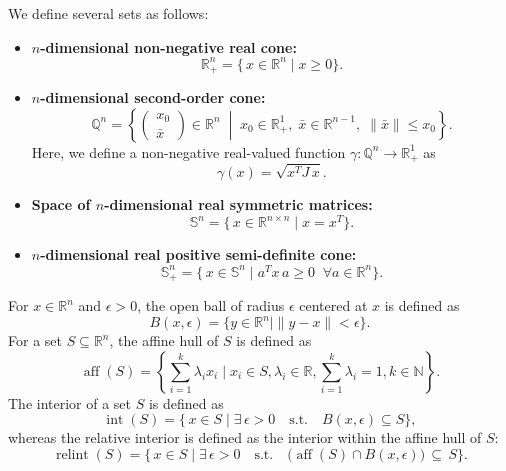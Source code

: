 We define several sets as follows:
\begin{itemize}
    \item 
    \textbf{$n$-dimensional non-negative real cone:} \\
    \[
      \mathbb{R}^n_+ 
      = \{\,x \in \mathbb{R}^n \mid x \geq 0 \}.
    \]

    \item 
    \textbf{$n$-dimensional second-order cone:} \\
    \[
      \mathbb{Q}^n 
      = \left\{ \begin{pmatrix} x_0 \\ \bar{x} \end{pmatrix} \in \mathbb{R}^n 
         \;\middle|\; x_0 \in \mathbb{R}^1_+, \; \bar{x} \in \mathbb{R}^{n-1}, \; \|\bar{x}\| \le x_0 \right\}.
    \]
    Here, we define a non-negative real-valued function $\gamma : \mathbb{Q}^n \to \mathbb{R}^1_+$ as
    \[
      \gamma(x) = \sqrt{x^T J\, x}.
    \]

    \item 
    \textbf{Space of $n$-dimensional real symmetric matrices:} \\
    \[
      \mathbb{S}^n = \{\, x \in \mathbb{R}^{n \times n} \mid x = x^T \}.
    \]

    \item 
    \textbf{$n$-dimensional real positive semi-definite cone:} \\
    \[
      \mathbb{S}^n_+ 
      = \{\, x \in \mathbb{S}^n \mid a^T x\, a \ge 0 \;\; \forall a \in \mathbb{R}^n \}.
    \]
\end{itemize}

For $x \in \mathbb{R}^n$ and $\epsilon > 0$, the open ball of radius $\epsilon$ centered at $x$ is defined as
\[
  B(x, \epsilon) = \{ y \in \mathbb{R}^n \mid \|y - x\| < \epsilon \}.
\]
For a set $S \subseteq \mathbb{R}^n$, the affine hull of $S$ is defined as
\[
  \operatorname{aff}(S) = \left\{ \sum_{i=1}^k \lambda_i x_i \mid x_i \in S, \lambda_i \in \mathbb{R}, \sum_{i=1}^k \lambda_i = 1, k \in \mathbb{N} \right\}.
\]
The interior of a set $S$ is defined as
\[
  \operatorname{int}(S) 
  = \{\, x \in S \mid \exists\, \epsilon > 0 \quad \text{s.t.} \quad B(x, \epsilon) \subseteq S \},
\]
whereas the relative interior is defined as the interior within the affine hull of $S$:
\[
\operatorname{relint}(S)
=\{\,
x \in S 
\mid \exists\, \epsilon > 0 \quad \text{s.t.} \quad \bigl(\operatorname{aff}(S)\cap B(x,\epsilon)\bigr)\,\subseteq\,S
\}.
\]
